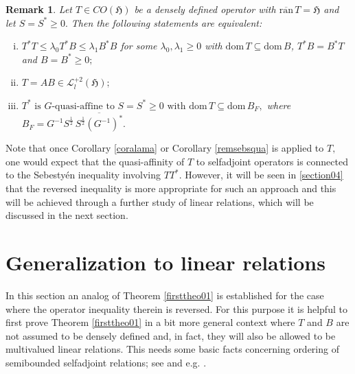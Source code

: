 \documentclass{amsart}
\newtheorem{remark}[theorem]{Remark}
\newcommand{\h}{\mathfrak{H}}
\newcommand{\coh}{CO(\h)}
\newcommand{\ranbarT}{\mathrm{\overline{ran}}\, T}
\newcommand{\D}{\mathrm{dom}\,}
\newcommand{\DT}{\mathrm{dom}\,T }
\newcommand{\DB}{\mathrm{dom}\,B }
\newcommand{\adj}{^*}
\newcommand{\inv}{^{-1}}
\newcommand{\tstar}{T^{*}}
\newcommand{\half}{^{\frac{1}{2}}}
\newcommand{\inclu}{\subseteq}
\newcommand{\ldeux}{\mathcal{L}_l^{+2}(\h)}
\numberwithin{equation}{section}
\renewcommand{\labelenumi}{(\arabic{enumi})}
\begin{document}
\begin{remark}
Let $T \in \coh$ be a densely defined operator with $\ranbarT =\h$  and let   $S=S\adj \geq 0.$ Then the following statements are equivalent:
\begin{enumerate}[(i)]\def\labelenumi{\rm(\roman{enumi})}
  \item $\tstar  T \leq \lambda_0 \tstar B \leq \lambda_1 B\adj  B  $ for some $ \lambda_0, \lambda_1 \geq 0$   with $  \DT \inclu \DB$, $\tstar B= B\adj T$     and $ B= B\adj \geq 0;$
  \item $T = AB \in \ldeux;$
  \item $\tstar \text{ is } G\text{-quasi-affine to } S = S^* \geq 0  \text{ with }  \DT \inclu \D B_F ,$ where $B_F=G\inv S\half \,  \overline{S\half  {(G\inv)}\adj}.$
\end{enumerate}
\end{remark}

Note that   once Corollary \ref{coralama} or Corollary \ref{remsebsqua}    is applied to $T,$ one would expect that  the quasi-affinity of $T$ to selfadjoint operators is connected to the Sebestyén inequality involving $T \tstar.$  However, it will be seen in \cref{section04} that   the reversed  inequality    is   more appropriate for such an approach and this will be achieved through a further study of linear relations, which will be discussed in the next section.

 \section{ Generalization to linear relations} \label{secrelation}



In this section an analog of Theorem \ref{firsttheo01} is established for the case where the operator inequality therein is reversed.
For this purpose it is helpful to first prove  Theorem \ref{firsttheo01}  in a bit more general context where $T$ and $B$ are not assumed to be densely defined and, in fact, they will also be allowed to be multivalued linear relations.
This needs some basic facts concerning ordering of semibounded selfadjoint relations; see \cite[Section~5.2]{behrndt2020boundary}
and e.g. \cite{Sandovi2013,hassi22014}.
\end{document}
